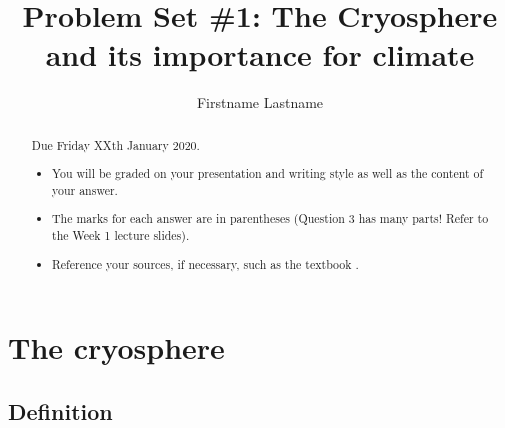 \documentclass[Afour,times]{SIOpset}
\begin{document}
 

\title{Problem Set \#1: The Cryosphere and its importance for climate}

\author{Firstname Lastname}




\begin{abstract}
Due Friday XXth January 2020.
\begin{itemize}
    \item You will be graded on your presentation and writing style as well as the content of your answer.
    \item The marks for each answer are in parentheses (Question 3 has many parts! Refer to the Week 1 lecture slides).
    \item Reference your sources, if necessary, such as the textbook \citep{marshall2011cryosphere}.
\end{itemize}
\end{abstract}
 
\maketitle

\allowdisplaybreaks
\hypersetup{colorlinks=true, linkcolor=blue}

\section{The cryosphere}

\subsection{Definition}
\end{document}
